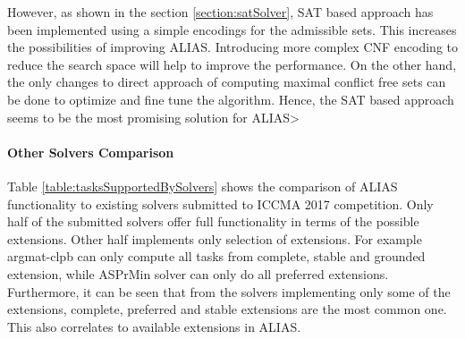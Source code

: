 However, as shown in the section \ref{section:satSolver}, SAT based approach has been implemented using a simple encodings for the admissible sets. This increases the possibilities of improving ALIAS. Introducing more complex CNF encoding to reduce the search space will help to improve the performance. On the other hand, the only changes to direct approach of computing maximal conflict free sets can be done to optimize and fine tune the algorithm. Hence, the SAT based approach seems to be the most promising solution for ALIAS>

\paragraph{Other Solvers Comparison}
Table \ref{table:tasksSupportedBySolvers} shows the comparison of ALIAS functionality to existing solvers submitted to ICCMA 2017 competition. Only half of the submitted solvers offer full functionality in terms of the possible extensions. Other half implements only selection of extensions. For example argmat-clpb can only compute all tasks from complete, stable and grounded extension, while ASPrMin solver can only do all preferred extensions. Furthermore, it can be seen that from the solvers implementing only some of the extensions, complete, preferred and stable extensions are the most common one. This also correlates to available extensions in ALIAS.

